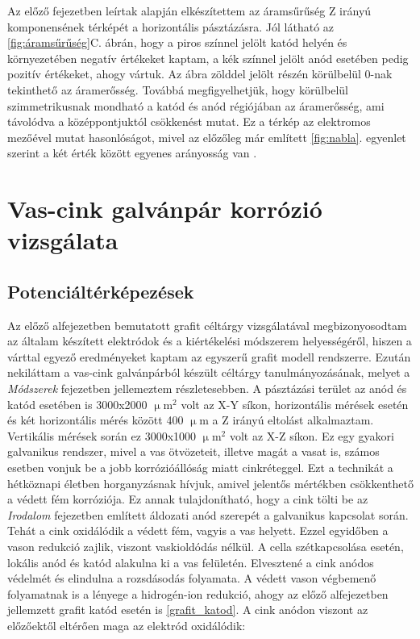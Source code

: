 Az előző fejezetben leírtak alapján elkészítettem az áramsűrűség Z irányú komponensének térképét a horizontális pásztázásra. Jól látható az \ref{fig:áramsűrűség}C. ábrán, hogy a piros színnel jelölt katód helyén és környezetében negatív értékeket kaptam, a kék színnel jelölt anód esetében pedig pozitív értékeket, ahogy vártuk. Az ábra zölddel jelölt részén körülbelül 0-nak tekinthető az áramerősség. Továbbá megfigyelhetjük, hogy körülbelül szimmetrikusnak mondható a katód és anód régiójában az áramerősség, ami távolódva a középpontjuktól csökkenést mutat. Ez a térkép az elektromos mezőével mutat hasonlóságot, mivel az előzőleg már említett \ref{fig:nabla}. egyenlet szerint a két érték között egyenes arányosság van \cite{isaacs1981scanning,bastos2017application}.

\section{Vas-cink galvánpár korrózió vizsgálata}
\subsection{Potenciáltérképezések}
Az előző alfejezetben bemutatott grafit céltárgy vizsgálatával megbizonyosodtam az általam készített elektródok és a kiértékelési módszerem helyességéről, hiszen a várttal egyező eredményeket kaptam az egyszerű grafit modell rendszerre. Ezután nekiláttam a vas-cink galvánpárból készült céltárgy tanulmányozásának, melyet a \emph{Módszerek} fejezetben jellemeztem részletesebben. A pásztázási terület az anód és katód esetében is 3000x2000 $\upmu$m$^2$ volt az X-Y síkon, horizontális mérések esetén és két horizontális mérés között 400 $\upmu$m a Z irányú eltolást alkalmaztam. Vertikális mérések során ez 3000x1000 $\upmu$m$^2$ volt az X-Z síkon. Ez egy gyakori galvanikus rendszer, mivel a vas ötvözeteit, illetve magát a vasat is, számos esetben vonjuk be a jobb korrózióállóság miatt cinkréteggel. Ezt a technikát a hétköznapi életben horganyzásnak hívjuk, amivel jelentős mértékben csökkenthető a védett fém korróziója. Ez annak tulajdonítható, hogy a cink tölti be az \emph{Irodalom} fejezetben említett áldozati anód szerepét a galvanikus kapcsolat során. Tehát a cink oxidálódik a védett fém, vagyis a vas helyett. Ezzel egyidőben a vason redukció zajlik, viszont vaskioldódás nélkül. A cella szétkapcsolása esetén, lokális anód és katód alakulna ki a vas felületén. Elvesztené a cink anódos védelmét és elindulna a rozsdásodás folyamata.
A védett vason végbemenő folyamatnak is a lényege a hidrogén-ion redukció, ahogy az előző alfejezetben jellemzett grafit katód esetén is \ref{grafit_katod}. A cink anódon viszont az előzőektől eltérően maga az elektród oxidálódik:


